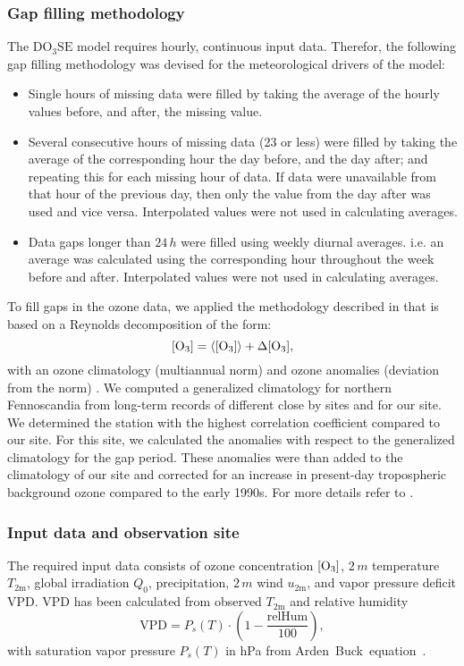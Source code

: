 \documentclass[bg, manuscript]{copernicus}
\begin{document}
\subsubsection{Gap filling methodology}
\label{subsec:gap_filling}
The $\mathrm{DO_3SE}$ model requires hourly, continuous input data. Therefor, the following gap filling methodology was devised for the meteorological drivers of the model:
\begin{itemize}
\item Single hours of missing data were filled by taking the average of the hourly values before, and after, the missing value.
\item Several consecutive hours of missing data (23 or less) were filled by taking the average of the corresponding hour the day before, and the day after; and repeating this for each missing hour of data. If data were unavailable from that hour of the previous day, then only the value from the day after was used and vice versa. Interpolated values were not used in calculating averages.
\item Data gaps longer than $24\,\unit{h}$ were filled using weekly diurnal averages. i.e. an average was calculated using the corresponding hour throughout the week before and after. Interpolated values were not used in calculating averages.
\end{itemize}

To fill gaps in the ozone data, we applied the methodology described in \citet{ACP:Falk2021} that is based on a Reynolds decomposition of the form:
\begin{equation}
  \chem{[O_3]} = \chem{\left<[O_3]\right>} + \chem{\Delta[O_3]},
  \label{eq:reynolds_decomp}
\end{equation}
with an ozone climatology (multiannual norm) \chem{\left<[O_3]\right>} and ozone anomalies (deviation from the norm) \chem{\Delta[O_3]}. We computed a generalized climatology for northern Fennoscandia from long-term records of different close by sites and for our site. We determined the station with the highest correlation coefficient compared to our site. For this site, we calculated the anomalies with respect to the generalized climatology for the gap period. These anomalies were than added to the climatology of our site and corrected for an increase in present-day tropospheric background ozone compared to the early 1990s. For more details refer to \citet{ACP:Falk2021}.

\subsubsection{Input data and observation site}
\label{subsec:data}
The required input data consists of ozone concentration $\chem{[O_3]}$, $2\,\unit{m}$ temperature $T_\mathrm{2m}$, global irradiation $Q_0$, precipitation, $2\,\unit{m}$ wind $u_\mathrm{2m}$, and vapor pressure deficit VPD. VPD has been calculated from observed $T_\mathrm{2m}$ and relative humidity
\begin{equation}
  \mathrm{VPD} = P_s(T) \cdot \left(1-\frac{\mathrm{relHum}}{100}\right),
\end{equation}
with saturation vapor pressure $P_s(T)$ in \unit{hPa} from Arden~Buck~equation~\citep{JAP:Buck1981, Buck2012}.
 
\end{document}
